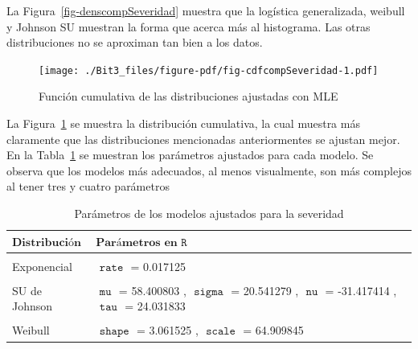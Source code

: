 \documentclass[
  letterpaper,
  onepage,
  openany]{scrreprt}
\begin{document}
La Figura~\ref{fig-denscompSeveridad} muestra que la logística
generalizada, weibull y Johnson SU muestran la forma que acerca más al
histograma. Las otras distribuciones no se aproximan tan bien a los
datos.

\begin{figure}[H]

\caption{\label{fig-cdfcompSeveridad}Función cumulativa de las
distribuciones ajustadas con MLE}

{\centering \texttt{[image: ./Bit3\_files/figure-pdf/fig-cdfcompSeveridad-1.pdf]}

}

\end{figure}

La Figura~\ref{fig-cdfcompSeveridad} se muestra la distribución
cumulativa, la cual muestra más claramente que las distribuciones
mencionadas anteriormentes se ajustan mejor. En la
Tabla~\ref{tbl-parametrosSeveridad} se muestran los parámetros ajustados
para cada modelo. Se observa que los modelos más adecuados, al menos
visualmente, son más complejos al tener tres y cuatro parámetros

\hypertarget{tbl-parametrosSeveridad}{}
\begin{table}
\caption{\label{tbl-parametrosSeveridad}Parámetros de los modelos ajustados para la severidad }\tabularnewline

\centering
\begin{tabular}{l|l}
\hline
\textbf{$\textbf{Distribución}$} & \textbf{$\textbf{Parámetros en } \texttt{R}$}\\
\hline
\cellcolor{gray!6}{Lognormal} & \cellcolor{gray!6}{$\texttt{ meanlog }$ = 3.972659 , $\texttt{ sdlog }$ = 0.502333}\\
\hline
Exponencial & $\texttt{ rate }$ = 0.017125\\
\hline
\cellcolor{gray!6}{Gamma} & \cellcolor{gray!6}{$\texttt{ shape }$ = 5.448032 , $\texttt{ rate }$ = 0.093297}\\
\hline
SU de Johnson & $\texttt{ mu }$ = 58.400803 , $\texttt{ sigma }$ = 20.541279 , $\texttt{ nu }$ = -31.417414 , $\texttt{ tau }$ = 24.031833\\
\hline
\cellcolor{gray!6}{Logística generalizada} & \cellcolor{gray!6}{$\texttt{ location }$ = 67.038277 , $\texttt{ scale }$ = 8.5276 , $\texttt{ shape }$ = 0.581247}\\
\hline
Weibull & $\texttt{ shape }$ = 3.061525 , $\texttt{ scale }$ = 64.909845\\
\hline
\end{tabular}
\end{table}
\end{document}
